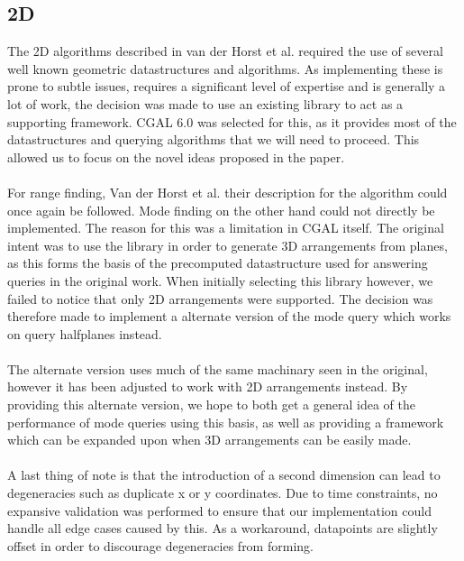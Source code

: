 \documentclass{article}
\newcommand{\fb}[1]{{#1}}
\newcommand{\fbnote}[1]{{}}
\begin{document}
\subsection{2D}
The 2D algorithms described in van der Horst et al. required the use
of several well known geometric datastructures and algorithms. As implementing
these is prone to subtle issues, requires a significant level of expertise and
is generally a lot of work, the decision was made to use an existing library to
act as a supporting framework. CGAL 6.0 \cite{cgal:foundations} was selected
for this, as it provides most of the datastructures and querying algorithms
that we will need to proceed. This allowed us to focus on the novel ideas
proposed in the paper. \\\\ For range finding, Van der Horst et al. their
description for the algorithm could once again be followed. Mode finding on the
other hand could not directly be implemented. The reason for this was a
limitation in CGAL itself. The original intent was to
use the library in order to generate 3D arrangements from planes, as this forms
the basis of the precomputed datastructure used for answering queries in the
original work. When initially selecting this library however, we failed to
notice that only 2D arrangements were supported. The decision was therefore
made to implement a alternate version of the mode query which works on query
halfplanes instead. \fbnote{As a response to Erwin's feedback: Emphasis on this was added in the introduction as this was recommended by Frank.}
\\\\ The alternate version uses much of the same machinary
seen in the original, however it has been adjusted to work with 2D arrangements
instead. By providing this alternate version, we hope to both get a general
idea of the performance of mode queries using this basis, as well as providing
a framework which can be expanded upon when 3D arrangements can be easily made. \\\\
\fb{
    A last thing of note is that the introduction of a second dimension can lead to degeneracies such as duplicate x or y coordinates. Due to time constraints, no expansive validation was performed to ensure that our implementation could handle all edge cases caused by this. As a workaround, datapoints are slightly offset in order to discourage degeneracies from forming.
}
\end{document}
